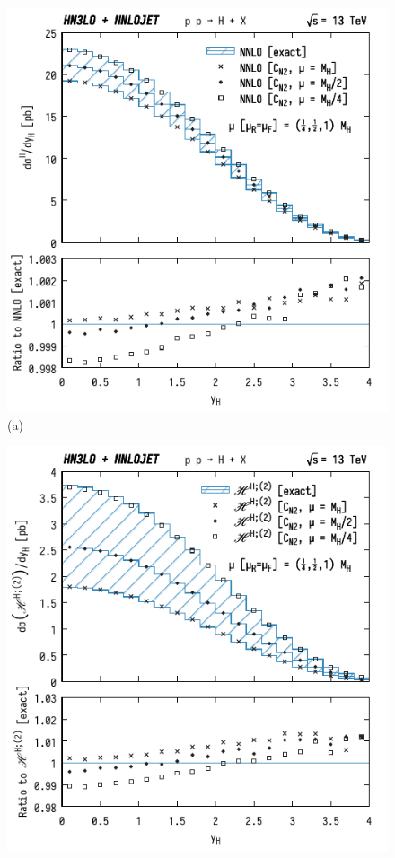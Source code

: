 \documentclass[12pt]{article}
\begin{document}
\begin{figure}[t]
\begin{minipage}{.48\linewidth}
  \centering
  \includegraphics[width=\linewidth]{./JHEP_figures/yH_B02_CN}
  \\
  (a)
\end{minipage}
\hfill
\begin{minipage}{.48\linewidth}
  \centering
  \includegraphics[width=\linewidth]{./JHEP_figures/yH_H2_CN}

\end{minipage}
\end{figure}
\end{document}
